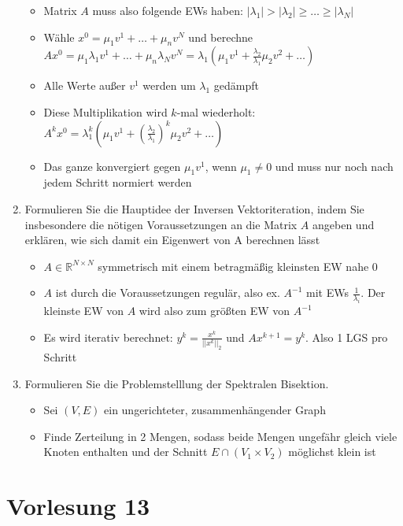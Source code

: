 \documentclass[]{article}
\newcommand*{\real}{\ensuremath{\mathbb{R}}}
\begin{document}
\begin{enumerate}
\begin{itemize}
				\item Matrix $A$ muss also folgende EWs haben: $|\lambda_1| > |\lambda_2| \geq \dots \geq |\lambda_N|$
				\item Wähle $x^0 = \mu_1v^1 + \dots + \mu_nv^N$ und berechne $Ax^0 = \mu_1\lambda_1v^1 + \dots + \mu_n\lambda_Nv^N = \lambda_1 ( \mu_1v^1 + \frac{\lambda_2}{\lambda_1}\mu_2v^2 + \dots)$
				\item Alle Werte außer $v^1$ werden um $\lambda_1$ gedämpft
				\item Diese Multiplikation wird $k$-mal wiederholt: $A^kx^0 = \lambda_1^k ( \mu_1v^1 + (\frac{\lambda_2}{\lambda_1})^k \mu_2v^2 + \dots)$
				\item Das ganze konvergiert gegen $\mu_1v^1$, wenn $\mu_1 \neq 0$ und muss nur noch nach jedem Schritt normiert werden
			\end{itemize}
		\item Formulieren Sie die Hauptidee der Inversen Vektoriteration, indem Sie insbesondere die nötigen Voraussetzungen an die Matrix $A$ angeben und erklären, wie sich damit ein Eigenwert von A berechnen lässt
			\begin{itemize}
				\item $A \in \real^{N \times N}$ symmetrisch mit einem betragmäßig kleinsten EW nahe $0$
				\item $A$ ist durch die Voraussetzungen regulär, also ex. $A^{-1}$ mit EWs $\frac{1}{\lambda_i}$. Der kleinste EW von $A$ wird also zum größten EW von $A^{-1}$
				\item Es wird iterativ berechnet: $y^k = \frac{x^k}{||x^k||_2}$ und $Ax^{k+1} = y^k$. Also 1 LGS pro Schritt
			\end{itemize}
		\item Formulieren Sie die Problemstelllung der Spektralen Bisektion.
			\begin{itemize}
				\item Sei $(V,E)$ ein ungerichteter, zusammenhängender Graph
				\item Finde Zerteilung in 2 Mengen, sodass beide Mengen ungefähr gleich viele Knoten enthalten und der Schnitt $E \cap (V_1 \times V_2)$ möglichst klein ist
			\end{itemize}
	\end{enumerate}

\section{Vorlesung 13}
\end{document}
